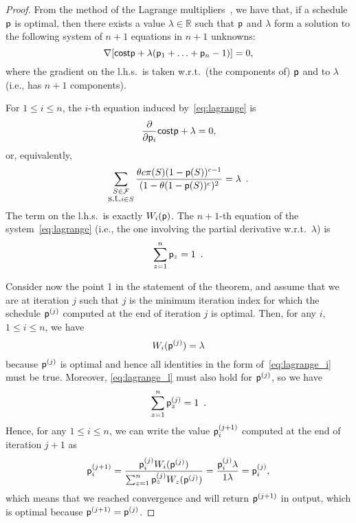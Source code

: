 \begin{proof}
	From the method of the Lagrange multipliers~\citemissing, we have that, if a
	schedule $\mathsf{p}$ is optimal, then there exists a value
	$\lambda\in\mathbb{R}$ such that $\mathsf{p}$ and $\lambda$ form a solution to
	the following system of $n+1$ equations in $n+1$ unknowns:
	\begin{equation}\label{eq:lagrange}
		\nabla [\mathsf{cost}{\mathsf{p}} + \lambda (\mathsf{p}_1+\ldots+\mathsf{p}_n-1)] = 0,
	\end{equation}
	where the gradient on the l.h.s.~is taken w.r.t.~(the components of)
	$\mathsf{p}$ and to $\lambda$ (i.e., has $n+1$ components).

	For $1\le i\le n$, the $i$-th equation induced by~\eqref{eq:lagrange} is
	\[
		\frac{\partial}{\partial \mathsf{p}_i} \mathsf{cost}{\mathsf{p}} + \lambda = 0,
	\]
	or, equivalently,
	\begin{equation}\label{eq:lagrange_i}
		\sum_{\substack{S\in\mathcal{F}\\\mbox{s.t.} i\in S}} \frac{\theta c
			\pi(S) (1-\mathsf{p}(S))^{c-1}}{(1-\theta(1-\mathsf{p}(S))^c)^2} =
			\lambda\enspace.
	\end{equation}
	The term on the l.h.s.~is exactly $W_i(\mathsf{p})$.
	The $n+1$-th equation of the system~\eqref{eq:lagrange} (i.e., the one
	involving the partial derivative w.r.t.~$\lambda$) is
	\begin{equation}\label{eq:lagrange_l}
		\sum_{z=1}^n \mathsf{p}_z = 1\enspace.
	\end{equation}

	Consider now the point 1 in the statement of the theorem, and assume that we
	are at iteration $j$ such that $j$ is the minimum iteration index for which
	the schedule $\mathsf{p}^{(j)}$ computed at the end of iteration $j$ is optimal.
	Then, for any $i$, $1\le i\le n$, we have
	\[
		W_i(\mathsf{p}^{(j)})=\lambda
	\]
	because $\mathsf{p}^{(j)}$ is optimal and hence all identities in the form
	of~\eqref{eq:lagrange_i} must be true.  Moreover, \eqref{eq:lagrange_l} must
	also hold for $\mathsf{p}^{(j)}$, so we have
	\[
		\sum_{z=1}^n \mathsf{p}^{(j)}_z = 1\enspace.
	\]
	Hence, for any $1\le i\le n$, we can write the value $\mathsf{p}^{(j+1)}_i$
	computed at the end of iteration $j+1$ as
	\[
		\mathsf{p}^{(j+1)}_i = \frac{\mathsf{p}^{(j)}_i W_i(\mathsf{p}^{(j)})}{\sum_{z=1}^n
		\mathsf{p}^{(j)}_z W_z(\mathsf{p}^{(j)})}=
		\frac{\mathsf{p}^{(j)}_i\lambda}{1\lambda}=\mathsf{p}^{(j)}_i,
	\]
	which means that we reached convergence and \algoname will return
	$\mathsf{p}^{(j+1)}$ in output, which is optimal because
	$\mathsf{p}^{(j+1)}=\mathsf{p}^{(j)}$.


\end{proof}
